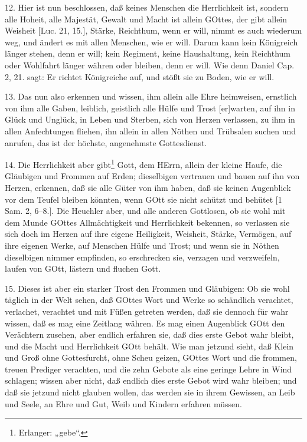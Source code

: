 12. Hier ist nun beschlossen, daß keines Menschen die Herrlichkeit ist, sondern alle Hoheit, alle Majestät, Gewalt und Macht ist allein GOttes, der gibt allein Weisheit [Luc. 21, 15.], Stärke, Reichthum, wenn er will, nimmt es auch wiederum weg, und ändert es mit allen Menschen, wie er will. Darum kann kein Königreich länger stehen, denn er will; kein Regiment, keine Haushaltung, kein Reichthum oder Wohlfahrt länger währen oder bleiben, denn er will. Wie denn Daniel Cap. 2, 21. sagt: Er richtet Königreiche auf, und stößt sie zu Boden, wie er will.

13. Das nun also erkennen und wissen, ihm allein alle Ehre heimweisen, ernstlich von ihm alle Gaben, leiblich, geistlich alle Hülfe und Trost [er]warten, auf ihn in Glück und Unglück, in Leben und Sterben, sich von Herzen verlassen, zu ihm in allen Anfechtungen fliehen, ihn allein in allen Nöthen und Trübsalen suchen und anrufen, das ist der höchste, angenehmste Gottesdienst.

14. Die Herrlichkeit aber gibt\footnote{Erlanger: „gebe“.} Gott, dem HErrn, allein der kleine Haufe, die Gläubigen und Frommen auf Erden; dieselbigen vertrauen und bauen auf ihn von Herzen, erkennen, daß sie alle Güter von ihm haben, daß sie keinen Augenblick vor dem Teufel bleiben könnten, wenn GOtt sie nicht schützt und behütet [1 Sam. 2, 6–8.]. Die Heuchler aber, und alle anderen Gottlosen, ob sie wohl mit dem Munde GOttes Allmächtigkeit und Herrlichkeit bekennen, so verlassen sie sich doch im Herzen auf ihre eigene Heiligkeit, Weisheit, Stärke, Vermögen, auf ihre eigenen Werke, auf Menschen Hülfe und Trost; und wenn sie in Nöthen dieselbigen nimmer empfinden, so erschrecken sie, verzagen und verzweifeln, laufen von GOtt, lästern und fluchen Gott.

15. Dieses ist aber ein starker Trost den Frommen und Gläubigen: Ob sie wohl täglich in der Welt sehen, daß GOttes Wort und Werke so schändlich verachtet, verlachet, verachtet und mit Füßen getreten werden, daß sie dennoch für wahr wissen, daß es mag eine Zeitlang währen. Es mag einen Augenblick GOtt den Verächtern zusehen, aber endlich erfahren sie, daß dies erste Gebot wahr bleibt, und die Macht und Herrlichkeit GOtt behält. Wie man jetzund sieht, daß Klein und Groß ohne Gottesfurcht, ohne Scheu geizen, GOttes Wort und die frommen, treuen Prediger verachten, und die zehn Gebote als eine geringe Lehre in Wind schlagen; wissen aber nicht, daß endlich dies erste Gebot wird wahr bleiben; und daß sie jetzund nicht glauben wollen, das werden sie in ihrem Gewissen, an Leib und Seele, an Ehre und Gut, Weib und Kindern erfahren müssen.

